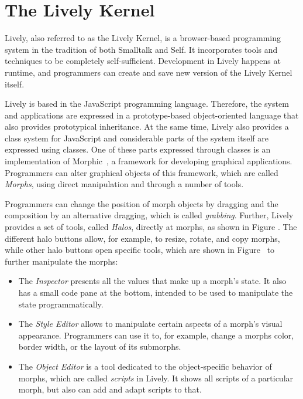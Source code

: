\section{The Lively Kernel}

Lively, also referred to as the Lively Kernel, is a browser-based programming system in the tradition of both Smalltalk and Self.
It incorporates tools and techniques to be completely self-sufficient.
Development in Lively happens at runtime, and programmers can create and save new version of the Lively Kernel itself.

Lively is based in the JavaScript programming language.
Therefore, the system and applications are expressed in a prototype-based object-oriented language that also provides prototypical inheritance.
At the same time, Lively also provides a class system for JavaScript and considerable parts of the system itself are expressed using classes.
One of these parts expressed through classes is an implementation of Morphic~\cite{Maloney1995Mor}, a framework for developing graphical applications.
Programmers can alter graphical objects of this framework, which are called \emph{Morphs}, using direct manipulation and through a number of tools.

Programmers can change the position of morph objects by dragging and the composition by an alternative dragging, which is called \emph{grabbing}.
Further, Lively provides a set of tools, called \emph{Halos}, directly at morphs, as shown in Figure .
The different halo buttons allow, for example, to resize, rotate, and copy morphs, while other halo buttons open specific tools, which are shown in Figure~ to further manipulate the morphs:

\begin{itemize}
    \item The \emph{Inspector} presents all the values that make up a morph's state. It also has a small code pane at the bottom, intended to be used to manipulate the state programmatically.
    \item The \emph{Style Editor} allows to manipulate certain aspects of a morph's visual appearance. Programmers can use it to, for example, change a morphs color, border width, or the layout of its submorphs.
    \item The \emph{Object Editor} is a tool dedicated to the object-specific behavior of morphs, which are called \emph{scripts} in Lively. It shows all scripts of a particular morph, but also can add and adapt scripts to that.
\end{itemize}

